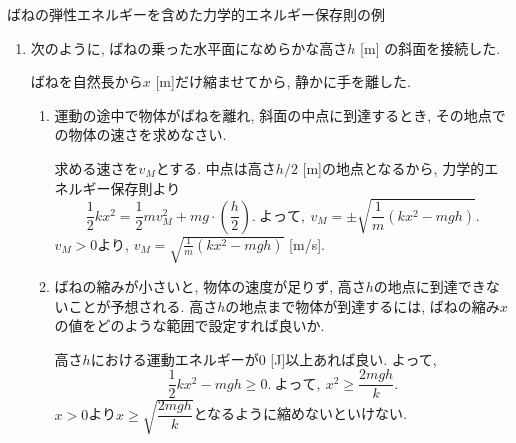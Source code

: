 \documentclass[11pt,dvipdfmx]{jsarticle}
\numberwithin{equation}{section} %
\begin{document}
\begin{exbox}{ばねの弾性エネルギーを含めた力学的エネルギー保存則の例}
\begin{enumerate}
\begin{enumerate}
        力学的エネルギー保存則から, 縮みきったときの自然長からの縮みを$y$ [m]とすると,
        \begin{equation}
            \frac{1}{2}ky^2 = \frac{1}{2}kx^2,\  y = \pm x.\ よって, x \text{[m]}だけ縮む. 
        \end{equation}
        \end{enumerate}
        \item 次のように, ばねの乗った水平面になめらかな高さ$h$ [m] の斜面を接続した.
        \begin{center}
        \end{center}
        ばねを自然長から$x$ [m]だけ縮ませてから, 静かに手を離した. 
        \begin{enumerate}
            \item 運動の途中で物体がばねを離れ, 斜面の中点に到達するとき, その地点での物体の速さを求めなさい. 
            
            求める速さを$v_{M}$とする. 中点は高さ$h/2$ [m]の地点となるから, 力学的エネルギー保存則より
            \begin{equation}
                \frac{1}{2}kx^2 = \frac{1}{2}mv_{M}^2 + mg\cdot \left(\frac{h}{2}\right).\ よって,\ v_{M} = \pm\sqrt{\frac{1}{m}(kx^2-mgh)}.
            \end{equation}
            $v_{M} > 0$より, $\displaystyle v_{M} = \sqrt{\frac{1}{m}(kx^2-mgh)}$ [m/s].\medskip
            \item ばねの縮みが小さいと, 物体の速度が足りず, 高さ$h$の地点に到達できないことが予想される. 高さ$h$の地点まで物体が到達するには, ばねの縮み$x$の値をどのような範囲で設定すれば良いか. 
            
            高さ$h$における運動エネルギーが0 [J]以上あれば良い. よって, 
            \begin{equation}
                \frac{1}{2}kx^2 - mgh\geq 0. \ よって,\ x^2 \geq  \frac{2mgh}{k}.
            \end{equation}
            $x > 0$より$x \geq \sqrt{\dfrac{2mgh}{k}}$となるように縮めないといけない.
        \end{enumerate}
    \end{enumerate}
\end{exbox}
\end{document}
